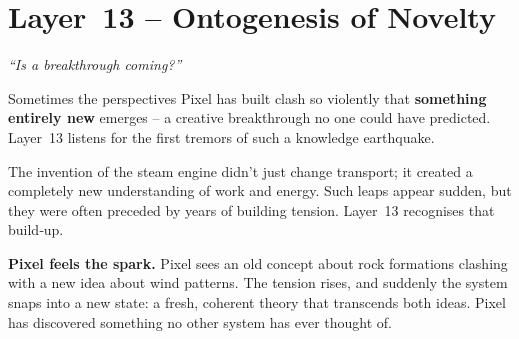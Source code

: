 \section{Layer~13 – Ontogenesis of Novelty}
\label{sec:layer13}

\begin{tcolorbox}[colback=blue!5, colframe=blue!60, title=\textbf{Superpower: The Seismologist}]
\begin{center}
\textit{“Is a breakthrough coming?”}
\end{center}
\end{tcolorbox}

Sometimes the perspectives Pixel has built clash so violently that
\textbf{something entirely new} emerges – a creative breakthrough no
one could have predicted.  Layer~13 listens for the first tremors of
such a knowledge earthquake.

\begin{tcolorbox}[colback=yellow!5, colframe=yellow!80, title=Real‑life analogy]
The invention of the steam engine didn’t just change transport; it
created a completely new understanding of work and energy.  Such leaps
appear sudden, but they were often preceded by years of building
tension.  Layer~13 recognises that build‑up.
\end{tcolorbox}

\textbf{Pixel feels the spark.}
Pixel sees an old concept about rock formations clashing with a new
idea about wind patterns.  The tension rises, and suddenly the system
snaps into a new state: a fresh, coherent theory that transcends both
ideas.  Pixel has discovered something no other system has ever thought
of.